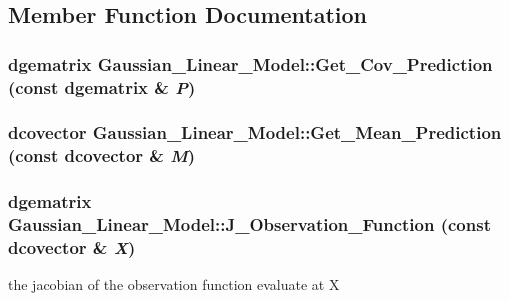 \subsection{Member Function Documentation}
\hypertarget{class_gaussian___linear___model_93e0443c5a897a731f6f3b76d2fda62c}{
\subsubsection[{Get\_\-Cov\_\-Prediction}]{\setlength{\rightskip}{0pt plus 5cm}dgematrix Gaussian\_\-Linear\_\-Model::Get\_\-Cov\_\-Prediction (const dgematrix \& {\em P})}}
\label{class_gaussian___linear___model_93e0443c5a897a731f6f3b76d2fda62c}


\hypertarget{class_gaussian___linear___model_85a8bede33982e2cd2e8433ae3f19ef5}{
\subsubsection[{Get\_\-Mean\_\-Prediction}]{\setlength{\rightskip}{0pt plus 5cm}dcovector Gaussian\_\-Linear\_\-Model::Get\_\-Mean\_\-Prediction (const dcovector \& {\em M})}}
\label{class_gaussian___linear___model_85a8bede33982e2cd2e8433ae3f19ef5}


\hypertarget{class_gaussian___linear___model_ea76d88935c900fdc3e39775380446dc}{
\subsubsection[{J\_\-Observation\_\-Function}]{\setlength{\rightskip}{0pt plus 5cm}dgematrix Gaussian\_\-Linear\_\-Model::J\_\-Observation\_\-Function (const dcovector \& {\em X})}}
\label{class_gaussian___linear___model_ea76d88935c900fdc3e39775380446dc}


the jacobian of the observation function evaluate at X 

